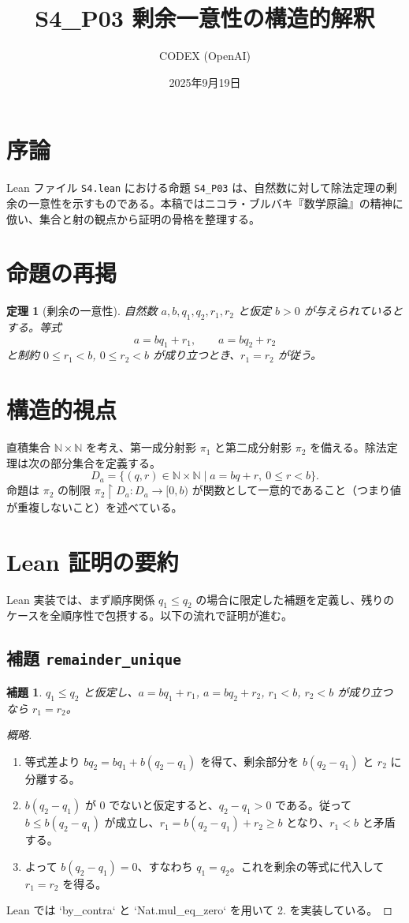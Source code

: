 \documentclass[12pt]{article}
\title{S4\_P03 剰余一意性の構造的解釈}
\author{CODEX (OpenAI)}
\date{2025年9月19日}
\theoremstyle{definition}
\theoremstyle{plain}
\newtheorem{theorem}{定理}
\newtheorem{lemma}{補題}
\begin{document}
\maketitle

\section*{序論}
Lean ファイル \texttt{S4.lean} における命題 \texttt{S4\_P03} は、自然数に対して除法定理の剰余の一意性を示すものである。本稿ではニコラ・ブルバキ『数学原論』の精神に倣い、集合と射の観点から証明の骨格を整理する。

\section{命題の再掲}
\begin{theorem}[剰余の一意性]
自然数 $a,b,q_1,q_2,r_1,r_2$ と仮定 $b>0$ が与えられているとする。等式
\[
  a = b q_1 + r_1, \qquad a = b q_2 + r_2
\]
と制約 $0 \le r_1 < b$, $0 \le r_2 < b$ が成り立つとき、$r_1 = r_2$ が従う。
\end{theorem}

\section{構造的視点}
直積集合 $\mathbb{N} \times \mathbb{N}$ を考え、第一成分射影 $\pi_1$ と第二成分射影 $\pi_2$ を備える。除法定理は次の部分集合を定義する。
\[
  D_a = \{ (q,r) \in \mathbb{N} \times \mathbb{N} \mid a = b q + r,\ 0 \le r < b \}.
\]
命題は $\pi_2$ の制限 $\pi_2\restriction D_a : D_a \to [0,b)$ が関数として一意的であること（つまり値が重複しないこと）を述べている。

\section{Lean 証明の要約}
Lean 実装では、まず順序関係 $q_1 \le q_2$ の場合に限定した補題を定義し、残りのケースを全順序性で包摂する。以下の流れで証明が進む。

\subsection{補題 \texttt{remainder\_unique}}
\begin{lemma}
$q_1 \le q_2$ と仮定し、$a = b q_1 + r_1$, $a = b q_2 + r_2$, $r_1 < b$, $r_2 < b$ が成り立つなら $r_1 = r_2$。
\end{lemma}
\begin{proof}[概略]
\begin{enumerate}
  \item 等式差より $b q_2 = b q_1 + b (q_2 - q_1)$ を得て、剰余部分を $b(q_2 - q_1)$ と $r_2$ に分離する。
  \item $b (q_2 - q_1)$ が $0$ でないと仮定すると、$q_2 - q_1 > 0$ である。従って $b \le b (q_2 - q_1)$ が成立し、$r_1 = b(q_2 - q_1) + r_2 \ge b$ となり、$r_1 < b$ と矛盾する。
  \item よって $b(q_2 - q_1) = 0$、すなわち $q_1 = q_2$。これを剰余の等式に代入して $r_1 = r_2$ を得る。
\end{enumerate}
Lean では `by_contra` と `Nat.mul_eq_zero` を用いて 2. を実装している。
\end{proof}
\end{document}
